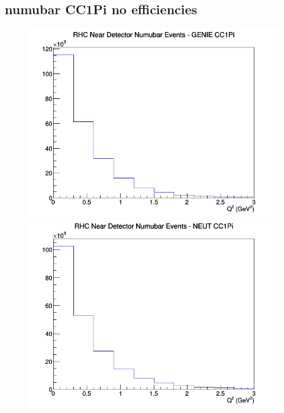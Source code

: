 \documentclass[12pt]{article}
\begin{document}
\subsection{numubar CC1Pi no efficiencies}
\begin{figure}[h]
\includegraphics[width=\linewidth]{Q2/nominal/CC1Pi_RHC_ND_numubar_Q2_GENIE.png}
\endminipage
{}
\includegraphics[width=\linewidth]{Q2/nominal/CC1Pi_RHC_ND_numubar_Q2_NEUT.png}
\endminipage
{}

\end{figure}
\end{document}
